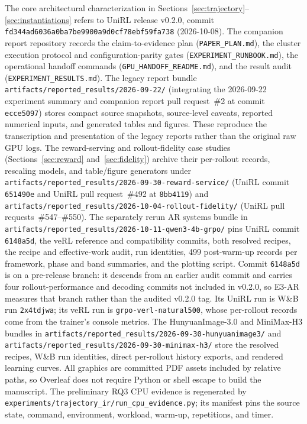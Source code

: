 \documentclass[10pt]{article}
\newcommand{\codepath}[1]{\texttt{#1}}
\begin{document}
The core architectural characterization in Sections~\ref{sec:trajectory}--\ref{sec:instantiations} refers to UniRL release v0.2.0, commit
{\small\texttt{fd344ad6036a0ba7be9900a9d0cf78ebf59fa738}} (2026-10-08).
The companion report repository records the claim-to-evidence plan (\texttt{PAPER\_PLAN.md}), the cluster execution protocol and configuration-parity gates (\texttt{EXPERIMENT\_RUNBOOK.md}), the operational handoff commands (\texttt{GPU\_HANDOFF\_README.md}), and the result audit (\codepath{EXPERIMENT\_RESULTS.md}).
The legacy report bundle \codepath{artifacts/reported\_results/2026-09-22/} (integrating the 2026-09-22 experiment summary and companion report pull request~\#2 at commit \texttt{ecce5097}) stores compact source snapshots, source-level caveats, reported numerical inputs, and generated tables and figures.
These reproduce the transcription and presentation of the legacy reports rather than the original raw GPU logs.
The reward-serving and rollout-fidelity case studies (Sections~\ref{sec:reward} and~\ref{sec:fidelity}) archive their per-rollout records, rescaling models, and table/figure generators under \codepath{artifacts/reported\_results/2026-09-30-reward-service/} (UniRL commit \texttt{651490e} and UniRL pull request~\#492 at \texttt{8bb4119}) and \codepath{artifacts/reported\_results/2026-10-04-rollout-fidelity/} (UniRL pull requests~\#547--\#550).
The separately rerun AR systems bundle in \codepath{artifacts/reported\_results/2026-10-11-qwen3-4b-grpo/} pins UniRL commit \texttt{6148a5d}, the veRL reference and compatibility commits, both resolved recipes, the recipe and effective-work audit, run identities, 499 post-warm-up records per framework, phase and band summaries, and the plotting script.
Commit \texttt{6148a5d} is on a pre-release branch: it descends from an earlier audit commit and carries four rollout-performance and decoding commits not included in v0.2.0, so E3-AR measures that branch rather than the audited v0.2.0 tag.
Its UniRL run is W\&B run \texttt{2x4tdjwa}; its veRL run is \texttt{grpo-verl-natural500}, whose per-rollout records come from the trainer's console metrics.
The HunyuanImage-3.0 and MiniMax-H3 bundles in \codepath{artifacts/reported\_results/2026-09-30-hunyuanimage3/} and \codepath{artifacts/reported\_results/2026-09-30-minimax-h3/} store the resolved recipes, W\&B run identities, direct per-rollout history exports, and rendered learning curves.
All graphics are committed PDF assets included by relative paths, so Overleaf does not require Python or shell escape to build the manuscript.
The preliminary RQ3 CPU evidence is regenerated by
\codepath{experiments/trajectory\_ir/run\_cpu\_evidence.py}; its manifest pins the
source state, command, environment, workload, warm-up, repetitions, and timer.
\end{document}
